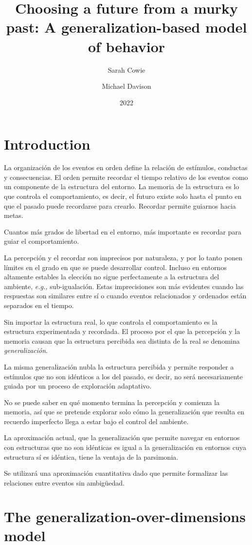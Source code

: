 \documentclass[a4paper,12pt]{article}
\title{Choosing a future from a murky past: A generalization-based model of behavior}
\author{Sarah Cowie \and Michael Davison}
\date{2022}
\begin{document}
{\scshape\bfseries \maketitle}

\section{Introduction}

La organización de los eventos en orden define la relación de estímulos, conductas y consecuencias. El orden permite recordar el tiempo relativo de los eventos como un componente de la estructura del entorno. La memoria de la estructura es lo que controla el comportamiento, es decir, el futuro existe solo hasta el punto en que el pasado puede recordarse para crearlo. Recordar permite guiarnos hacia metas.

Cuantos más grados de libertad en el entorno, más importante es recordar para guiar el comportamiento.

La percepción y el recordar son imprecisos por naturaleza, y por lo tanto ponen límites en el grado en que se puede desarrollar control. Incluso en entornos altamente estables la elección no sigue perfectamente a la estructura del ambiente, {\itshape e.g.,} sub-igualación. Estas imprecisiones son más evidentes cuando las respuestas son similares entre sí o cuando eventos relacionados y ordenados están separados en el tiempo.

Sin importar la estructura real, lo que controla el comportamiento es la estructura experimentada y recordada. El proceso por el que la percepción y la memoria causan que la estructura percibida sea distinta de la real se denomina {\itshape generalización}.

La misma generalización nubla la estructura percibida y permite responder a estímulos que no son idénticos a los del pasado, es decir, no será necesariamente guiada por un proceso de exploración adaptativo.

No se puede saber en qué momento termina la percepción y comienza la memoria, así que se pretende explorar solo cómo la generalización que resulta en recuerdo imperfecto llega a estar bajo el control del ambiente.

La aproximación actual, que la generalización que permite navegar en entornos con estructuras que no son idénticas es igual a la generalización en entornos cuya estructura sí es idéntica, tiene la ventaja de la parsimonia.

Se utilizará una aproximación cuantitativa dado que permite formalizar las relaciones entre eventos sin ambigüedad.

\section{The generalization-over-dimensions model}
\end{document}
